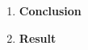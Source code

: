 \documentclass[10pt,a4paper]{article}
\begin{document}
\begin{enumerate}[label=\Roman*]
\item
\textbf{Conclusion}\\

\item
\textbf{Result}\\

\end{enumerate}
\end{document}
